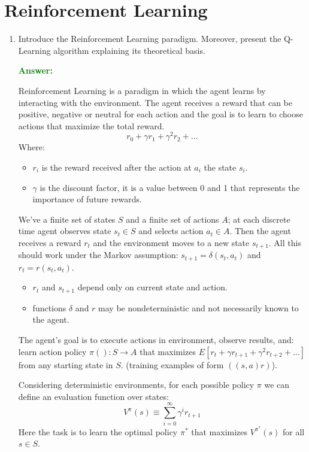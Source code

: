 \documentclass[12pt]{article}
\begin{document}
\section{Reinforcement Learning}
\begin{enumerate}[label=\textbf{RL.\arabic*}]
    \item Introduce the Reinforcement Learning paradigm.
    Moreover, present the Q-Learning algorithm explaining its theoretical basis.

    \textcolor{green}{\textbf{Answer:}}

    Reinforcement Learning is a paradigm in which the agent learns by interacting with the environment.
    The agent receives a reward that can be positive, negative or neutral for each action and the goal is to learn to choose actions
    that maximize the total reward.
    \begin{equation}
        r_0+\gamma r_1+\gamma^2 r_2+\ldots 
    \end{equation}
    Where:
    \begin{itemize}
        \item $r_i$ is the reward received after the action at $a_i$ the state $s_i$.
        \item $\gamma$ is the discount factor, it is a value between 0 and 1 that represents the importance of future rewards.
    \end{itemize}
    We've a finite set of states $S$ and a finite set of actions $A$; at each discrete time agent observes state $s_t\in S$ and selects action $a_t\in A$.
    Then the agent receives a reward $r_t$ and the environment moves to a new state $s_{t+1}$.
    All this should work under the Markov assumption: $s_{t+1} = \delta(s_t,a_t)$ and $r_t = r(s_t,a_t)$.
    \begin{itemize}
        \item $r_t$ and $s_{t+1}$ depend only on current state and action.
        \item functions $\delta$ and $r$ may be nondeterministic and not necessarily known to the agent.
    \end{itemize}
    The agent's goal is to execute actions in environment, observe results, and: 
    learn action policy $\pi():S\rightarrow A$ that maximizes $E[r_t+\gamma r_{t+1}+\gamma^2 r_{t+2}+\ldots]$ from any starting state in $S$.
    (training examples of form $((s,a)r)$).

    Considering deterministic environments, for each possible policy $\pi$ we can define an evaluation function over states: 
    \begin{equation}
        V^\pi(s) \equiv \sum_{i=0}^{\infty}\gamma^i r_{t+1}
    \end{equation}
    Here the task is to learn the optimal policy $\pi^*$ that maximizes $V^{\pi^*}(s)$ for all $s\in S$.


\end{enumerate}
\end{document}
